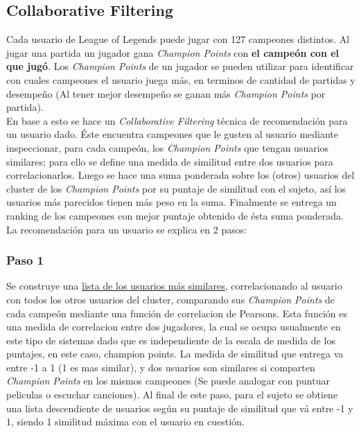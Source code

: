 \documentclass[letterpaper,11pt, spanish]{article}
\begin{document}
\subsection{Collaborative Filtering}

Cada usuario de League of Legends puede jugar con 127 campeones distintos. Al jugar una partida un jugador gana \textit{Champion Points} con \textbf{el campeón con el que jugó}.
Los \textit{Champion Points} de un jugador se pueden utilizar para identificar con cuales campeones el usuario juega más, en terminos de cantidad de partidas y desempeño (Al tener mejor desempeño se ganan más \textit{Champion Points} por partida). \\

En base a esto se hace un \textit{Collaborative Filtering} técnica de recomendación para un usuario dado. Éste encuentra campeones que le gusten al usuario mediante inspeccionar, para cada campeón, los \textit{Champion Points} que tengan usuarios similares; para ello se define una medida de similitud entre dos usuarios para correlacionarlos. Luego se hace una suma ponderada sobre los (otros) usuarios del cluster de los \textit{Champion Points} por su puntaje de similitud con el sujeto, así los usuarios más parecidos tienen más peso en la suma. Finalmente se entrega un ranking de los campeones con mejor puntaje obtenido de ésta suma ponderada.\\
La recomendación para un usuario se explica en 2 pasos:

\subsubsection{Paso 1}

Se construye una \underline{lista de los usuarios más similares}, correlacionando al usuario con todos los otros usuarios del cluster, comparando sus \textit{Champion Points} de cada campeón mediante una función de correlacion de Pearsons. Esta función es una medida de correlacion entre dos jugadores, la cual se ocupa usualmente en este tipo de sistemas dado que es independiente de la escala de medida de los puntajes, en este caso, champion points. La medida de similitud que entrega va entre -1 a 1 (1 es mas similar), y dos usuarios son similares si comparten \textit{Champion Points} en los mismos campeones (Se puede analogar con puntuar peliculas o escuchar canciones). Al final de este paso, para el sujeto se obtiene una lista descendiente de usuarios según su puntaje de similitud que vá entre -1 y 1, siendo 1 similitud máxima con el usuario en cuestión.
\end{document}
